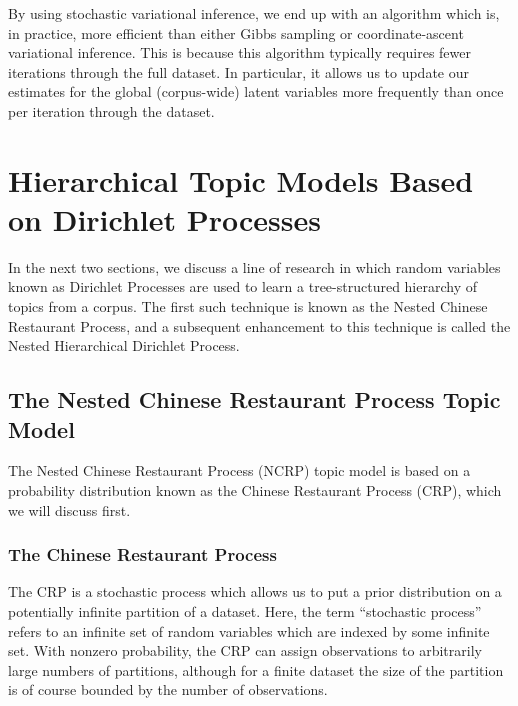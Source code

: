 \documentclass{article}
\begin{document}

By using stochastic variational inference, we end up with an algorithm which is, in practice, more efficient than either Gibbs sampling or coordinate-ascent variational inference.
This is because this algorithm typically requires fewer iterations through the full dataset.
In particular, it allows us to update our estimates for the global (corpus-wide) latent variables more frequently than once per iteration through the dataset.

\section{Hierarchical Topic Models Based on Dirichlet Processes}

In the next two sections, we discuss a line of research in which random variables known as Dirichlet Processes are used to learn a tree-structured hierarchy of topics from a corpus.
The first such technique is known as the Nested Chinese Restaurant Process, and a subsequent enhancement to this technique is called the Nested Hierarchical Dirichlet Process.

\subsection{The Nested Chinese Restaurant Process Topic Model}

The Nested Chinese Restaurant Process (NCRP) topic model is based on a probability distribution known as the Chinese Restaurant Process (CRP), which we will discuss first.

\subsubsection{The Chinese Restaurant Process}

The CRP is a stochastic process which allows us to put a prior distribution on a potentially infinite partition of a dataset.
Here, the term ``stochastic process'' refers to an infinite set of random variables which are indexed by some infinite set.
With nonzero probability, the CRP can assign observations to arbitrarily large numbers of partitions, although for a finite dataset the size of the partition is of course bounded by the number of observations.
\end{document}
